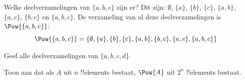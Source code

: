 \documentclass[openany]{memoir}
\begin{document}
\begin{ex}
Welke deelverzamelingen van $\{ a, b, c \}$ zijn er? Dit zijn:
$\emptyset$, $\{a \}$, $\{b\}$, $\{c\}$, $\{a, b\}$, $\{a, c\}$,
$\{b, c\}$ en $\{a, b, c\}$. De verzameling van al deze
deelverzamelingen is $\Pow{\{a,b,c\}}$:
\[
\Pow{\{ a, b, c \}} = \{\emptyset, \{a \}, \{b\}, \{c\}, \{a, b\},
\{b, c\}, \{a, c\}, \{a, b, c\}\}
\]
\end{ex}

\begin{prob}
Geef alle deelverzamelingen van $\{a, b, c, d\}$.
\end{prob}

\begin{prob}
Toon aan dat als $A$ uit $n$ !!{element}s bestaat, $\Pow{A}$ uit
$2^n$ !!{element}s bestaat.
\end{prob}
\endgroup

\begingroup
\def\olfilename{OLP-0007}
\def\olfilepath{content/sets-functions-relations/sets/}
\hypertarget{unit-OLP-0007}{}



\end{document}
